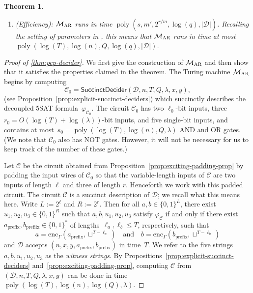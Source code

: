 \documentclass[11pt]{article}
\newtheorem{theorem}{Theorem}[section]
\theoremstyle{definition}
\newcommand{\F}{\ensuremath{\mathbb{F}}}
\DeclareMathOperator{\poly}{poly}
\newcommand{\decider}{\mathcal{D}}
\newcommand{\gamestyle}[1]{\ensuremath{\textsc{#1}}\xspace}
\newcommand{\ar}{\gamestyle{AR}}
\newcommand{\succinctdecider}{\ensuremath{\mathsf{SuccinctDecider}}}
\newcommand{\circuit}{\mathcal{C}}
\newcommand{\pcpverifier}{\mathcal{M}_\ar}
\newcommand{\qlen}{Q}
\begin{document}
\begin{theorem}
\begin{enumerate}
\begin{enumerate}
    \item On a random~$x \in \F_q^m$, the probability that $f_1(x) \neq g_1(x)$
      is at most $0.2$, and likewise for~$f_2$ and~$g_2$.
    \end{enumerate}
  \item[4.]
    \emph{(Efficiency):} $\pcpverifier$ runs in time $\poly(s, m', 2^{r/m},
    \log(q),|\decider|)$.
    Recalling the setting of parameters in , this means that
    $\pcpverifier$ runs in time at most~$\poly(\log(T), \log(n), \qlen,
    \log(q),|\decider|)$.
  \end{enumerate}
\end{theorem}

\begin{proof}[Proof of \cref{thm:pcp-decider}]
  We first give the construction of $\pcpverifier$ and then show that it
  satisfies the properties claimed in the theorem.
  The Turing machine $\pcpverifier$ begins by computing
  \[
    \circuit_0 = \succinctdecider(\decider, n, T, \qlen, \lambda, x, y),
  \]
  (see Proposition~\ref{prop:explicit-succinct-deciders}) which succinctly
  describes the decoupled 5SAT formula~$\varphi_{\circuit_0}$.
  The circuit $\circuit_0$ has two $\ell_0$-bit inputs, three $r_0 = O(\log(T) +
  \log(\lambda))$-bit inputs, and five single-bit inputs, and contains at
  most~$s_0 = \poly(\log(T), \log(n), \qlen,\lambda)$ AND and OR gates.
  (We note that $\circuit_0$ also has NOT gates.
  However, it will not be necessary for us to keep track of the number of these gates.)

  Let $\circuit$ be the circuit obtained from
  Proposition~\ref{prop:exciting-padding-prop} by padding the input wires of
  $\circuit_0$ so that the variable-length inputs of $\circuit$ are two inputs
  of length $\ell$ and three of length $r$.
  Henceforth we work with this padded circuit.
  The circuit $\circuit$ is a succinct description of $\decider$; we recall what
  this means here.
  Write $L:= 2^{\ell}$ and $R := 2^{r}$.
  Then for all $a, b\in \{0, 1\}^L$, there exist $u_1, u_2, u_3 \in \{0, 1\}^R$
  such that $a, b, u_1, u_2, u_3$ satisfy $\varphi_{\circuit}$ if and only if
  there exist $a_{\mathrm{prefix}}, b_{\mathrm{prefiix}} \in \{0, 1\}^*$ of
  lengths~$\ell_a, \ell_b \leq T$, respectively, such that
  \begin{equation*}
    a = \mathrm{enc}_\Gamma(a_{\mathrm{prefix}}, \sqcup^{T - \ell_a})
    \quad
    \text{and}
    \quad
    b = \mathrm{enc}_\Gamma(b_{\mathrm{prefix}}, \sqcup^{T - \ell_b})
  \end{equation*}
  and $\decider$ accepts $(n, x, y, a_{\mathrm{prefix}}, b_{\mathrm{prefix}})$
  in time~$T$.
  We refer to the five strings $a, b, u_1, u_2, u_3$ as the \emph{witness
  strings}.
  By Propositions~\ref{prop:explicit-succinct-deciders}
  and~\ref{prop:exciting-padding-prop}, computing $\circuit$ from $(\decider, n,
  T, \qlen, \lambda, x, y)$ can be done in time $\poly(\log(T), \log(n),
  \log(\qlen),\lambda)$.


\end{proof}
\end{document}
